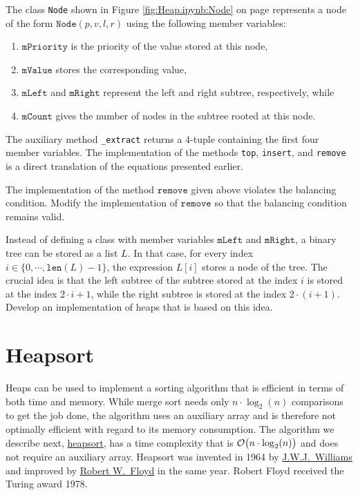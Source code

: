 The class \texttt{Node} shown in Figure \ref{fig:Heap.ipynb:Node} on page \pageref{fig:Heap.ipynb:Node}
represents a node of the form $\texttt{Node}(p, v, l, r)$ using the following member variables:
\begin{enumerate}
\item $\texttt{mPriority}$ is the priority of the value stored at this node,
\item $\texttt{mValue}$    stores the corresponding value,
\item $\texttt{mLeft}$ and $\texttt{mRight}$ represent the left and right subtree, respectively, while
\item $\texttt{mCount}$    gives the number of nodes in the subtree rooted at this node.
\end{enumerate}
The auxiliary method \texttt{\_extract} returns a 4-tuple containing the first four member variables.
The implementation of the methods \texttt{top}, \texttt{insert}, and \texttt{remove} is a direct translation of
the equations presented earlier.

\exercise
The implementation of the method $\texttt{remove}$ given above violates the balancing condition.
Modify the implementation of $\texttt{remove}$ so that the balancing condition remains valid. \eox

\exercise
Instead of defining a class with member variables $\texttt{mLeft}$ and $\texttt{mRight}$, a binary tree
can be stored as a list $L$.  In that case, for every index $i \in \bigl\{0, \cdots, \texttt{len}(L)-1 \bigl\}$,
the expression $L[i]$ stores a node of the tree.  The crucial idea is that the left subtree of the
subtree stored at the index $i$ is stored at the index $2 \cdot i + 1$, while the right subtree is
stored at the index $2 \cdot (i + 1)$.  Develop an implementation of heaps that is based on this idea.
\eox

\section{Heapsort \label{sec:heapsort}}
Heaps can be used to implement a sorting algorithm that is efficient in terms of both time and
memory. While merge sort needs only $n \cdot \log_2(n)$ comparisons to get the job done, the
algorithm uses an auxiliary array and is therefore not optimally efficient with regard to its memory
consumption.  The algorithm we describe next, \href{https://en.wikipedia.org/wiki/Heapsort}{heapsort}, has
a time complexity that is $\mathcal{O}\bigl(n \cdot \log_2(n)\bigr)$ and does not require an auxiliary
array.  Heapsort was invented in 1964 by
\href{https://en.wikipedia.org/wiki/J._W._J._Williams}{J.W.J.~Williams} \cite{williams:1964}
and improved by \href{https://en.wikipedia.org/wiki/Robert_W._Floyd}{Robert W.~Floyd} \cite{floyd:1964} in the
same year.  Robert Floyd received the Turing award 1978.

